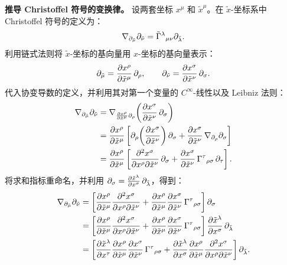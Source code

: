 \medskip
\noindent\textbf{推导 Christoffel 符号的变换律。}\quad
设两套坐标 $x^\mu$ 和 $\tilde{x}^\mu$。在 $\tilde{x}$-坐标系中 Christoffel 符号的定义为：
\begin{equation}
    \nabla_{\partial_{\tilde{\mu}}} \partial_{\tilde{\nu}} = \tilde{\Gamma}^\lambda{}_{\mu\nu} \partial_{\tilde{\lambda}}.
\end{equation}
利用链式法则将 $\tilde{x}$-坐标的基向量用 $x$-坐标的基向量表示：
\begin{equation}
    \partial_{\tilde{\mu}} = \frac{\partial x^\rho}{\partial \tilde{x}^\mu}\,\partial_\rho, \qquad
    \partial_{\tilde{\nu}} = \frac{\partial x^\sigma}{\partial \tilde{x}^\nu}\,\partial_\sigma.
\end{equation}
代入协变导数的定义，并利用其对第一个变量的 $C^\infty$-线性以及 Leibniz 法则：
\begin{align}
    \nabla_{\partial_{\tilde{\mu}}} \partial_{\tilde{\nu}} 
    &= \nabla_{\frac{\partial x^\rho}{\partial \tilde{x}^\mu}\partial_\rho}\!\left(\frac{\partial x^\sigma}{\partial \tilde{x}^\nu}\,\partial_\sigma\right) \nonumber\\
    &= \frac{\partial x^\rho}{\partial \tilde{x}^\mu} \left[ \partial_\rho\!\left(\frac{\partial x^\sigma}{\partial \tilde{x}^\nu}\right)\partial_\sigma 
        + \frac{\partial x^\sigma}{\partial \tilde{x}^\nu}\,\nabla_{\partial_\rho}\partial_\sigma \right] \nonumber\\
    &= \frac{\partial x^\rho}{\partial \tilde{x}^\mu}\left[ \frac{\partial^2 x^\sigma}{\partial x^\rho\partial\tilde{x}^\nu}\,\partial_\sigma 
        + \frac{\partial x^\sigma}{\partial \tilde{x}^\nu}\,\Gamma^\tau{}_{\rho\sigma}\,\partial_\tau \right].
\end{align}
将求和指标重命名，并利用 $\partial_\sigma = \frac{\partial\tilde{x}^\lambda}{\partial x^\sigma}\,\partial_{\tilde{\lambda}}$，得到：
\begin{align}
    \nabla_{\partial_{\tilde{\mu}}} \partial_{\tilde{\nu}} 
    &= \left[ \frac{\partial x^\rho}{\partial \tilde{x}^\mu}\frac{\partial^2 x^\sigma}{\partial x^\rho\partial\tilde{x}^\nu}
        + \frac{\partial x^\rho}{\partial \tilde{x}^\mu}\frac{\partial x^\sigma}{\partial \tilde{x}^\nu}\,\Gamma^\tau{}_{\rho\sigma} \right] \partial_\sigma \nonumber\\
    &= \left[ \frac{\partial x^\rho}{\partial \tilde{x}^\mu}\frac{\partial^2 x^\sigma}{\partial x^\rho\partial\tilde{x}^\nu}
        + \frac{\partial x^\rho}{\partial \tilde{x}^\mu}\frac{\partial x^\sigma}{\partial \tilde{x}^\nu}\,\Gamma^\tau{}_{\rho\sigma} \right] 
        \frac{\partial\tilde{x}^\lambda}{\partial x^\sigma}\,\partial_{\tilde{\lambda}} \nonumber\\
    &= \left[ \frac{\partial\tilde{x}^\lambda}{\partial x^\tau}\frac{\partial x^\rho}{\partial\tilde{x}^\mu}\frac{\partial x^\sigma}{\partial\tilde{x}^\nu}\,\Gamma^\tau{}_{\rho\sigma}
        + \frac{\partial\tilde{x}^\lambda}{\partial x^\sigma}\frac{\partial x^\rho}{\partial\tilde{x}^\mu}\frac{\partial^2 x^\sigma}{\partial x^\rho\partial\tilde{x}^\nu} \right] \partial_{\tilde{\lambda}}.
\end{align}
